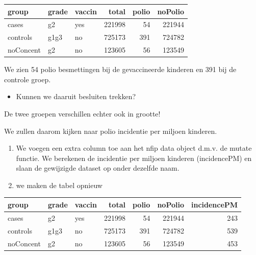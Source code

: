 \documentclass[
  12pt,dutch]{book}
\newenvironment{Shaded}{\begin{snugshade}}{\end{snugshade}}
\newcommand{\AttributeTok}[1]{\textcolor[rgb]{0.13,0.29,0.53}{#1}}
\newcommand{\DecValTok}[1]{\textcolor[rgb]{0.00,0.00,0.81}{#1}}
\newcommand{\FloatTok}[1]{\textcolor[rgb]{0.00,0.00,0.81}{#1}}
\newcommand{\FunctionTok}[1]{\textcolor[rgb]{0.13,0.29,0.53}{\textbf{#1}}}
\newcommand{\NormalTok}[1]{#1}
\newcommand{\OtherTok}[1]{\textcolor[rgb]{0.56,0.35,0.01}{#1}}
\newcommand{\SpecialCharTok}[1]{\textcolor[rgb]{0.81,0.36,0.00}{\textbf{#1}}}
\providecommand{\tightlist}{%
  \setlength{\itemsep}{0pt}\setlength{\parskip}{0pt}}
\theoremstyle{definition}
\theoremstyle{definition}
\theoremstyle{definition}
\theoremstyle{definition}
\theoremstyle{remark}
\begin{document}
\begin{tabular}{l|l|l|r|r|r}
\hline
group & grade & vaccin & total & polio & noPolio\\
\hline
cases & g2 & yes & 221998 & 54 & 221944\\
\hline
controls & g1g3 & no & 725173 & 391 & 724782\\
\hline
noConcent & g2 & no & 123605 & 56 & 123549\\
\hline
\end{tabular}

We zien 54 polio besmettingen bij de gevaccineerde kinderen
en 391 bij de controle groep.

\begin{itemize}
\tightlist
\item
  Kunnen we daaruit besluiten trekken?
\end{itemize}

De twee groepen verschillen echter ook in grootte!

We zullen daarom kijken naar polio incidentie per miljoen kinderen.

\begin{enumerate}
\def\labelenumi{\arabic{enumi}.}
\tightlist
\item
  We voegen een extra column toe aan het nfip data object d.m.v. de mutate functie. We berekenen de incidentie per miljoen kinderen (incidencePM) en slaan de gewijzigde dataset op onder dezelfde naam.
\item
  we maken de tabel opnieuw
\end{enumerate}

\begin{Shaded}
\end{Shaded}

\begin{tabular}{l|l|l|r|r|r|r}
\hline
group & grade & vaccin & total & polio & noPolio & incidencePM\\
\hline
cases & g2 & yes & 221998 & 54 & 221944 & 243\\
\hline
controls & g1g3 & no & 725173 & 391 & 724782 & 539\\
\hline
noConcent & g2 & no & 123605 & 56 & 123549 & 453\\
\hline
\end{tabular}
\end{document}
